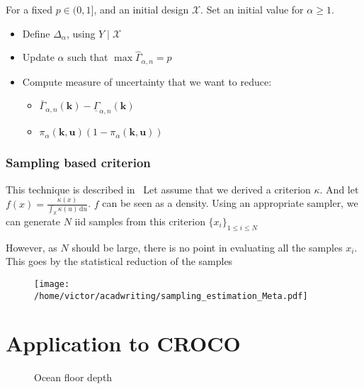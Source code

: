 \documentclass[a4paper,11pt]{article}
\newcommand{\Xspace}{\mathbb{X}}
\newcommand{\kk}{\mathbf{k}}
\newcommand{\uu}{\mathbf{u}}
\theoremstyle{defi}
\numberwithin{thmCounter}{section}
\begin{document}
For a fixed $p\in (0, 1]$, and an initial design $\mathcal{X}$. Set an initial value for $\alpha \geq 1$. 
\begin{itemize}
\item Define $\Delta_{\alpha}$, using $Y \mid \mathcal{X}$
\item Update $\alpha$ such that $\max \hat{\Gamma}_{\alpha,n} = p$
\item Compute measure of uncertainty that we want to reduce:
  \begin{itemize}
  \item $\bar{\Gamma}_{\alpha,n}(\kk) - \underline{\Gamma}_{\alpha,n}(\kk)$
  \item $\pi_{\alpha}(\kk,\uu)(1-\pi_{\alpha}(\kk,\uu))$
  \end{itemize}
\end{itemize}

\subsubsection{Sampling based criterion}
\label{sec:sampling_based_criterion}
This technique is described in~\cite{dubourg_reliability-based_2011}
Let assume that we derived a criterion $\kappa$. And let $f(x) = \frac{\kappa(x)}{\int_{\Xspace}\kappa(u)\,\mathrm{d}u}$. $f$ can be seen as a density.
  Using an appropriate sampler, we can generate $N$ iid samples from this criterion $\{x_i\}_{1\leq i \leq N}$
  
However, as $N$ should be large, there is no point in evaluating all the samples $x_i$. This goes by the statistical reduction of the samples

\begin{figure}[ht]
  \centering
  \texttt{[image: /home/victor/acadwriting/sampling\_estimation\_Meta.pdf]}
  \caption{\label{fig:label} }
\end{figure}


\section{Application to CROCO}
\label{sec:croco_application}

\begin{figure}[!h]
  \centering
  \scalebox{0.6}{}
  \caption{Ocean floor depth}
\end{figure}


\end{document}
